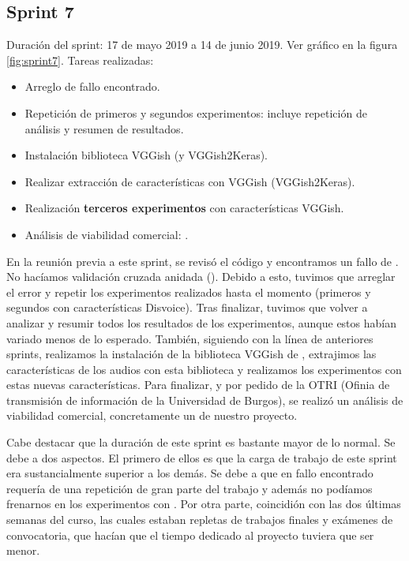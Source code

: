 \subsection{Sprint 7}
Duración del sprint: 17 de mayo 2019 a 14 de junio 2019. Ver gráfico  en la figura \ref{fig:sprint7}.
Tareas realizadas:
\begin{itemize}
\item Arreglo de fallo encontrado.
\item Repetición de primeros y segundos experimentos: incluye repetición de análisis y resumen de resultados.
\item Instalación biblioteca VGGish (y VGGish2Keras).
\item Realizar extracción de características con VGGish (VGGish2Keras).
\item Realización \textbf{terceros experimentos} con características VGGish.
\item Análisis de viabilidad comercial: .
\end{itemize}
En la reunión previa a este sprint, se revisó el código y encontramos un fallo de . No hacíamos validación cruzada anidada (). Debido a esto, tuvimos que arreglar el error y repetir los experimentos realizados hasta el momento (primeros y segundos con características Disvoice). Tras finalizar, tuvimos que volver a analizar y resumir todos los resultados de los experimentos, aunque estos habían variado menos de lo esperado. También, siguiendo con la línea de anteriores sprints, realizamos la instalación de la biblioteca VGGish de , extrajimos las características de los audios con esta biblioteca y realizamos los experimentos con estas nuevas características. Para finalizar, y por pedido de la OTRI (Ofinia de transmisión de información de la Universidad de Burgos), se realizó un análisis de viabilidad comercial, concretamente un  de nuestro proyecto.

Cabe destacar que la duración de este sprint es bastante mayor de lo normal. Se debe a dos aspectos. El primero de ellos es que la carga de trabajo de este sprint era sustancialmente superior a los demás. Se debe a que en fallo encontrado requería de una repetición de gran parte del trabajo y además no podíamos frenarnos en los experimentos con . Por otra parte, coincidión con las dos últimas semanas del curso, las cuales estaban repletas de trabajos finales y exámenes de convocatoria, que hacían que el tiempo dedicado al proyecto tuviera que ser menor.

